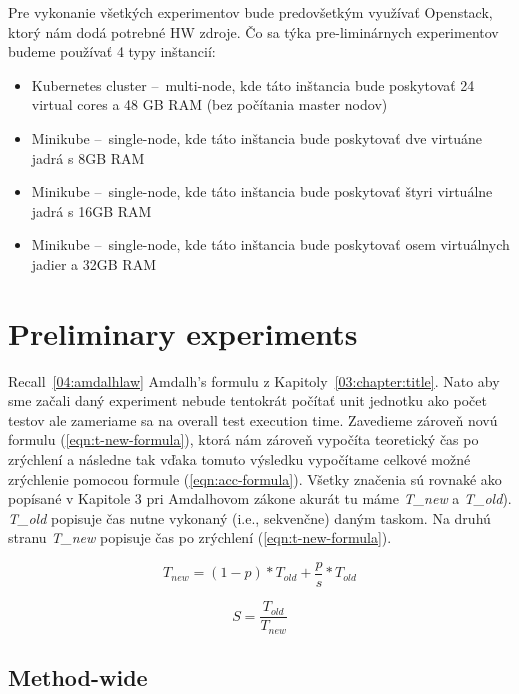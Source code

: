Pre vykonanie všetkých experimentov bude predovšetkým využívať Openstack, ktorý nám dodá potrebné HW zdroje.
Čo sa týka pre-liminárnych experimentov budeme používať 4 typy inštancií:
\begin{itemize}
    \item Kubernetes cluster \---\ multi-node, kde táto inštancia bude poskytovať 24 virtual cores a 48 GB RAM (bez počítania master nodov)
    \item Minikube \---\ single-node, kde táto inštancia bude poskytovať dve virtuáne jadrá s 8GB RAM
    \item Minikube \---\ single-node, kde táto inštancia bude poskytovať štyri virtuálne jadrá s 16GB RAM
    \item Minikube \---\ single-node, kde táto inštancia bude poskytovať osem virtuálnych jadier a 32GB RAM
\end{itemize}

\section{Preliminary experiments}

Recall~\ref{04:amdalhlaw} Amdalh's formulu z Kapitoly~\ref{03:chapter:title}.
Nato aby sme začali daný experiment nebude tentokrát počítať unit
jednotku ako počet testov ale zameriame sa na overall test execution time.
Zavedieme zároveň novú formulu (\eqref{eqn:t-new-formula}), ktorá nám zároveň vypočíta teoretický čas po zrýchlení a následne tak vďaka tomuto
výsledku vypočítame celkové možné zrýchlenie pomocou formule (\eqref{eqn:acc-formula}). Všetky značenia sú rovnaké
ako popísané v Kapitole 3 pri Amdalhovom zákone akurát tu máme \emph{T\_{new}} a \emph{T\_{old}}). \emph{T\_{old}} popisuje čas nutne vykonaný
(i.e., sekvenčne) daným taskom. Na druhú stranu \emph{T\_{new}} popisuje čas po zrýchlení (\eqref{eqn:t-new-formula}).

\begin{equation}
    \label{eqn:t-new-formula}
    T_{new} = (1 - p) * T_{old} +  \frac{p}{s} * T_{old}
    \tag{4}
\end{equation}

\begin{equation}
    \label{eqn:acc-formula}
    S = \frac{T_{old}}{T_{new}}
    \tag{5}
\end{equation}

\subsection{Method-wide}

